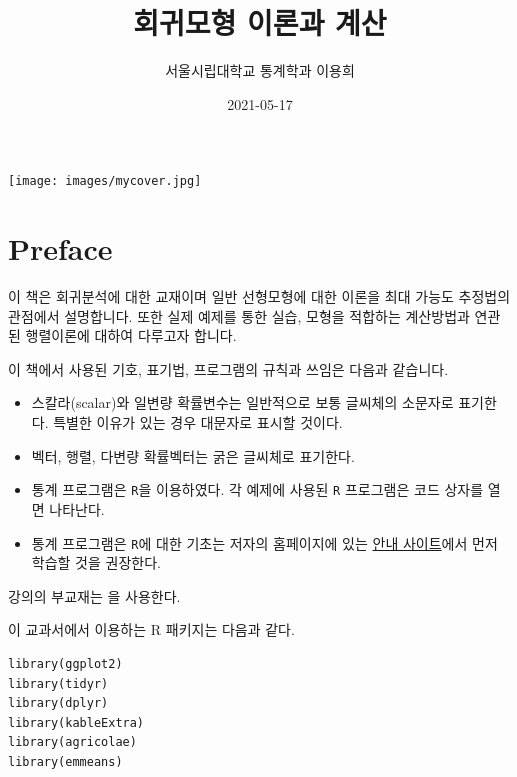 \documentclass[
  10pt,
]{book}
\title{회귀모형 이론과 계산}
\author{서울시립대학교 통계학과 이용희}
\date{2021-05-17}
\makeatletter
\providecommand{\tightlist}{%
  \setlength{\itemsep}{0pt}\setlength{\parskip}{0pt}}
\newenvironment{kframe}{%
\medskip{}
\setlength{\fboxsep}{.8em}
 \def\at@end@of@kframe{}%
 \ifinner\ifhmode%
  \def\at@end@of@kframe{\end{minipage}}%
  \begin{minipage}{\columnwidth}%
 \fi\fi%
 \def\FrameCommand##1{\hskip\@totalleftmargin \hskip-\fboxsep
 \colorbox{shadecolor}{##1}\hskip-\fboxsep
     \hskip-\linewidth \hskip-\@totalleftmargin \hskip\columnwidth}%
 \MakeFramed {\advance\hsize-\width
   \@totalleftmargin\z@ \linewidth\hsize
   \@setminipage}}%
 {\par\unskip\endMakeFramed%
 \at@end@of@kframe}
\newenvironment{rmdblock}[1]
  {
  \begin{itemize}
  \renewcommand{\labelitemi}{
    \raisebox{-.7\height}[0pt][0pt]{
      {\setkeys{Gin}{width=3em,keepaspectratio}\texttt{[image: images/\#1]}}
    }
  }
  \setlength{\fboxsep}{1em}
  \begin{kframe}
  \item
  }
  {
  \end{kframe}
  \end{itemize}
  }
\newenvironment{rmdimportant}
  {\begin{rmdblock}{important}}
  {\end{rmdblock}}
\theoremstyle{definition}
\theoremstyle{definition}
\theoremstyle{definition}
\theoremstyle{definition}
\theoremstyle{remark}
\makeatother
\begin{document}
\maketitle

\thispagestyle{empty}
\begin{center}
\texttt{[image: images/mycover.jpg]}
\end{center}

\setlength{\abovedisplayskip}{-5pt}
\setlength{\abovedisplayshortskip}{-5pt}

{
\hypersetup{linkcolor=}
\setcounter{tocdepth}{1}
\tableofcontents
}
\listoftables
\listoffigures
\hypertarget{preface}{%
\chapter*{Preface}\label{preface}}


이 책은 회귀분석에 대한 교재이며 일반 선형모형에 대한 이론을 최대 가능도 추정법의 관점에서 설명합니다. 또한 실제 예제를 통한 실습, 모형을 적합하는 계산방법과 연관된 행렬이론에 대하여 다루고자 합니다.

\begin{rmdimportant}
이 책에서 사용된 기호, 표기법, 프로그램의 규칙과 쓰임은 다음과 같습니다.

\begin{itemize}
\tightlist
\item
  스칼라(scalar)와 일변량 확률변수는 일반적으로 보통 글씨체의 소문자로 표기한다. 특별한 이유가 있는 경우 대문자로 표시할 것이다.
\item
  벡터, 행렬, 다변량 확률벡터는 굵은 글씨체로 표기한다.
\item
  통계 프로그램은 \texttt{R}을 이용하였다. 각 예제에 사용된 \texttt{R} 프로그램은 코드 상자를 열면 나타난다.
\item
  통계 프로그램은 \texttt{R}에 대한 기초는 저자의 홈페이지에 있는 \href{https://ilovedata.github.io/computing/}{안내 사이트}에서 먼저 학습할 것을 권장한다.
\end{itemize}
\end{rmdimportant}

강의의 부교재는 \citet{kang2016you} 을 사용한다.

이 교과서에서 이용하는 R 패키지는 다음과 같다.

\begin{verbatim}
library(ggplot2)
library(tidyr)
library(dplyr)
library(kableExtra)
library(agricolae)
library(emmeans)
\end{verbatim}
\end{document}
